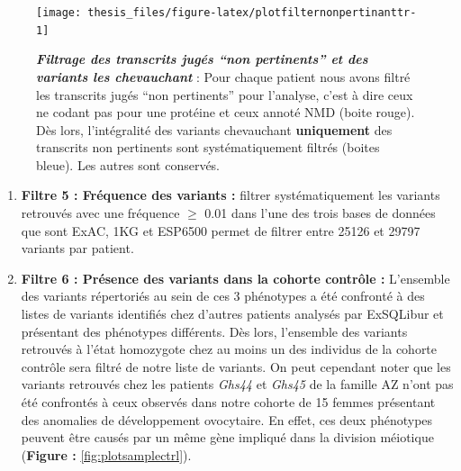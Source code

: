 \documentclass[12pt,a4paper,twoside]{ugathesis}
\theoremstyle{definition}
\theoremstyle{definition}
\theoremstyle{definition}
\theoremstyle{remark}
\begin{document}
\newpage 

\begin{figure}

{\centering \texttt{[image: thesis\_files/figure-latex/plotfilternonpertinanttr-1]} 

}

\caption[Filtrage des transcrits jugés "non pertinents" et des variants les chevauchant]{\textbf{\emph{Filtrage des transcrits
jugés ``non pertinents'' et des variants les chevauchant}} : Pour chaque
patient nous avons filtré les transcrits jugés ``non pertinents'' pour
l'analyse, c'est à dire ceux ne codant pas pour une protéine et ceux
annoté NMD (boite rouge). Dès lors, l'intégralité des variants
chevauchant \textbf{uniquement} des transcrits non pertinents sont
systématiquement filtrés (boites bleue). Les autres sont conservés.}\label{fig:plotfilternonpertinanttr}
\end{figure}









\begin{enumerate}
\def\labelenumi{\arabic{enumi}.}
\setcounter{enumi}{4}
\item
  \textbf{Filtre 5 : Fréquence des variants :} filtrer systématiquement
  les variants retrouvés avec une fréquence \(\ge\) 0.01 dans l'une des
  trois bases de données que sont ExAC, 1KG et ESP6500 permet de filtrer
  entre 25126 et 29797 variants par patient.
\item
  \textbf{Filtre 6 : Présence des variants dans la cohorte contrôle :}
  L'ensemble des variants répertoriés au sein de ces 3 phénotypes a été
  confronté à des listes de variants identifiés chez d'autres patients
  analysés par ExSQLibur et présentant des phénotypes différents. Dès
  lors, l'ensemble des variants retrouvés à l'état homozygote chez au
  moins un des individus de la cohorte contrôle sera filtré de notre
  liste de variants. On peut cependant noter que les variants retrouvés
  chez les patients \emph{Ghs44} et \emph{Ghs45} de la famille AZ n'ont
  pas été confrontés à ceux observés dans notre cohorte de 15 femmes
  présentant des anomalies de développement ovocytaire. En effet, ces
  deux phénotypes peuvent être causés par un même gène impliqué dans la
  division méiotique (\textbf{Figure :} \ref{fig:plotsamplectrl}).\\
  \newpage
\end{enumerate}
\end{document}
